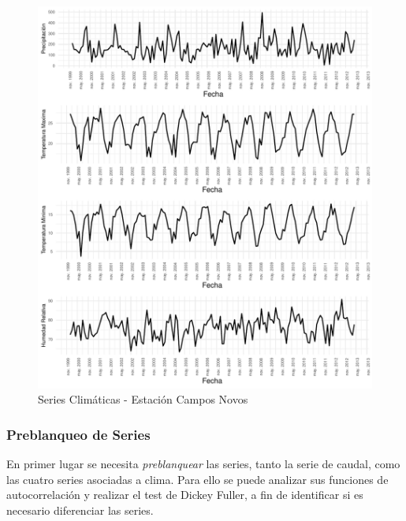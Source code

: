 \documentclass[12pt,oneside]{book}\usepackage[]{graphicx}\usepackage[]{color}
\makeatletter
\def\maxwidth{ %
  \ifdim\Gin@nat@width>\linewidth
    \linewidth
  \else
    \Gin@nat@width
  \fi
}
\newenvironment{knitrout}{}{} %
\theoremstyle{definition} %
\makeatother
\begin{document}
\begin{knitrout}
\color{fgcolor}\begin{figure}[H]

{\centering \includegraphics[width=\maxwidth]{figure/unnamed-chunk-23-1} 

}

\caption{\label{fig:sarimax_serieCl} Series Climáticas - Estación Campos Novos}\label{fig:unnamed-chunk-23}
\end{figure}


\end{knitrout}


\subsubsection{Preblanqueo de Series}

En primer lugar se necesita \textit{preblanquear} las series, tanto la serie de caudal, como las cuatro series asociadas a clima. Para ello se puede analizar sus funciones de autocorrelación y realizar el test de Dickey Fuller, a fin de identificar si es necesario diferenciar las series. 
\end{document}

